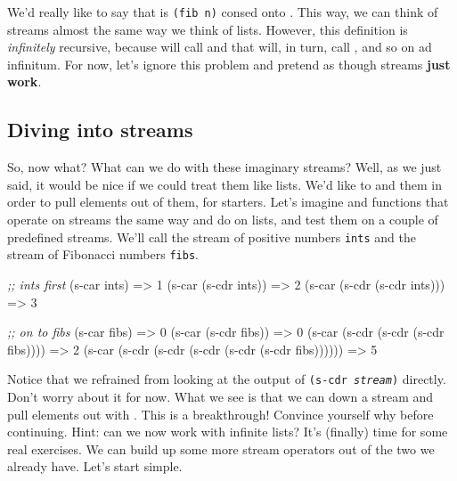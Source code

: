 \documentclass[pdftex,11pt]{article}
\begin{document}
We'd really like to say that  is {\tt (fib n)} consed onto
. This way, we can think of streams almost the same
way we think of lists. However, this definition is {\it infinitely}
recursive, because  will call  and
that will, in turn, call , and so on ad
infinitum. For now, let's ignore this problem and pretend as though
streams {\bf just work}.

\subsection{Diving into streams}

So, now what? What can we do with these imaginary streams? Well, as we
just said, it would be nice if we could treat them like lists. We'd
like to \car and \cdr them in order to pull elements out of them, for
starters. Let's imagine \scar and \scdr functions that operate on
streams the same way \car and \cdr do on lists, and test them on a
couple of predefined streams. We'll call the stream of positive
numbers {\tt ints} and the stream of Fibonacci numbers {\tt fibs}.

\begin{interaction}
\textit{;; ints first}
(s-car ints)
=> 1
(s-car (s-cdr ints))
=> 2
(s-car (s-cdr (s-cdr ints)))
=> 3
\end{interaction}
\begin{interaction}
\textit{;; on to fibs}
(s-car fibs)
=> 0
(s-car (s-cdr fibs))
=> 0
(s-car (s-cdr (s-cdr (s-cdr fibs))))
=> 2
(s-car (s-cdr (s-cdr (s-cdr (s-cdr (s-cdr fibs))))))
=> 5
\end{interaction}

Notice that we refrained from looking at the output of {\tt (s-cdr
  {\it stream})} directly. Don't worry about it for now. What we see
is that we can \scdr down a stream and pull elements out with
\scar. This is a breakthrough! Convince yourself why before
continuing. Hint: can we now work with infinite lists? It's (finally)
time for some real exercises. We can build up some more stream
operators out of the two we already have. Let's start simple.
\end{document}
